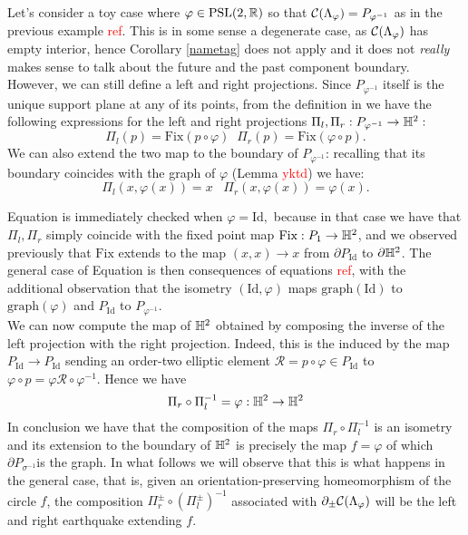 \begin{example}\label{413} Let's consider a toy case where $\varphi\in\text{PSL}(2,\mathbb{R})$ so that $\mathcal{C}(\Lambda_\varphi)=P_{\varphi^{-1}}$ as in the previous example \textcolor{red}{ref}. This is in some sense a degenerate case, as $\mathcal{C}(\Lambda_\varphi)$ has empty interior, hence Corollary \ref{nametag} does not apply and it does not \textit{really} makes sense to talk about the future and the past component boundary. However, we can still define a left and right projections. Since $P_{\varphi^{-1}}$ itself is the unique support plane at any of its points, from the definition in  we have the following expressions for the left and right projections $\Pi_l,\Pi_r:P_{\varphi^{-1}}\to\mathbb{H}^2:$
\begin{equation}
    \Pi_l(p)=\text{Fix}(p\circ\varphi)\;\;\Pi_r(p)=\text{Fix}(\varphi\circ p).
\end{equation}   
We can also extend the two map to the boundary of $P_{\varphi^{-1}}$: recalling that its boundary coincides with the graph of $\varphi$ (Lemma \textcolor{red}{yktd}) we have: 
\begin{equation}\label{simproj}
    \Pi_l(x,\varphi(x))=x \;\;\;\Pi_r(x,\varphi(x))=\varphi(x). 
\end{equation}

Equation  is immediately checked when $\varphi=\text{Id},$ because in that case we have that $\Pi_l,\Pi_r$ simply coincide with the fixed point map $\text{Fix}:P_1\to\mathbb{H}^2$, and we observed previously that $\text{Fix}$ extends to the map $(x,x)\to x$ from $\partial P_{\text{Id}}$ to $\partial\mathbb{H}^2$. The general case of Equation  is then consequences of equations \textcolor{red}{ref}, with the additional observation that the isometry $(\text{Id},\varphi)$ maps $\text{graph}(\text{Id})$ to $\text{graph}(\varphi)$ and $P_\text{Id}$ to $P_{\varphi^{-1}}$. \\
We can now compute the map of $\mathbb{H}^2$ obtained by composing the inverse of the left projection with the right projection. Indeed, this is the induced by the map $P_{\text{Id}}\to P_\text{Id}$ sending an order-two elliptic element $\mathcal{R}=p\circ\varphi\in P_{\text{Id}}$ to $\varphi\circ p=\varphi\mathcal{R}\circ\varphi^{-1}$. Hence we have   
\begin{equation}\label{composition}
    \Pi_r\circ\Pi_l^{-1}=\varphi:\mathbb{H}^2\to\mathbb{H}^2
\end{equation}
In conclusion we have that the composition of the maps $\Pi_r\circ\Pi_l^{-1}$ is an isometry and its extension to the boundary of $\mathbb{H}^2$ is precisely the map $f=\varphi$ of which $\partial P_{\sigma^{-1}}$is the graph. In what follows we will observe that this is what happens in the general case, that is, given an orientation-preserving homeomorphism of the circle $f$, the composition $\Pi_r^\pm\circ(\Pi_l^\pm)^{-1}$ associated with $\partial_\pm\mathcal{C}(\Lambda_\varphi)$ will be the left and right earthquake extending $f$.
\end{example}

